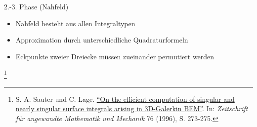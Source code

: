 \documentclass[10pt]{beamer}
\let\svthefootnote\thefootnote
\begin{document}
\begin{frame}{2.-3. Phase (Nahfeld)}
  \begin{itemize}
    \item Nahfeld besteht aus allen Integraltypen
    \item Approximation durch unterschiedliche Quadraturformeln
    \item Eckpunkte zweier Dreiecke müssen zueinander permutiert werden
  \end{itemize}
  
  \footnotesize
  \let\thefootnote\relax\footnote{S. A. Sauter und C. Lage.
  \href{https://link.springer.com/article/10.1007\%2Fs00211-015-0757-y}{
  ``On the efficient computation of singular and nearly singular surface 
  integrals arising in 3D-Galerkin BEM''}. In:   \textit{Zeitschrift f\"ur 
  angewandte Mathematik und Mechanik } 76 (1996), S. 273-275.}
  \addtocounter{footnote}{-1}\let\thefootnote\svthefootnote\relax
  \normalsize
\end{frame}
\end{document}

